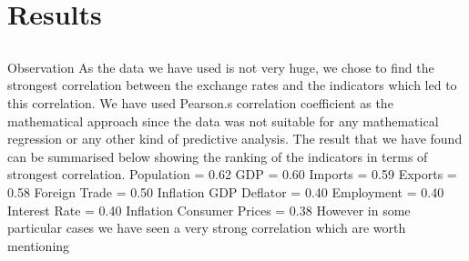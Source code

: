 \section{Results}
\subsection{}{Observation}
As the data we have used is not very huge, we chose to find the strongest correlation between the exchange rates and the indicators which led to this correlation. We have used Pearson.s correlation coefficient as the mathematical approach since the data was not suitable for any mathematical regression or any other kind of predictive analysis. The result that we have found can be summarised below showing the ranking of the indicators in terms of strongest correlation.
\newline
Population = 0.62\newline
GDP = 0.60\newline
Imports = 0.59\newline
Exports = 0.58\newline
Foreign Trade = 0.50\newline
Inflation GDP Deflator = 0.40\newline
Employment = 0.40\newline
Interest Rate = 0.40\newline
Inflation Consumer Prices = 0.38\newline
However in some particular cases we have seen a very strong correlation which are worth mentioning
